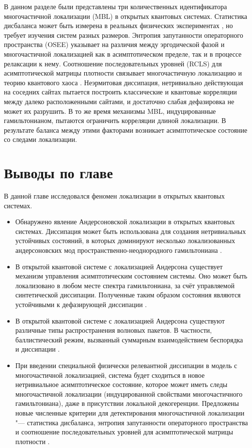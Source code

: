 В данном разделе были представлены три количественных идентификатора многочастичной локализации (MBL) в открытых квантовых системах.
Статистика дисбаланса может быть измерена в реальных физических экспериментах \cite{Schreiber2015, Choi2016, Bordia2017, Lschen2017}, но требует изучения систем разных размеров. 
Энтропия запутанности операторного пространства (OSEE) указывает на различия между эргодической фазой и многочастичной локализацией как в асимптотическом пределе, так и в процессе релаксации к нему.
Соотношение последовательных уровней (RCLS) для асимптотической матрицы плотности связывает многочастичную локализацию и теорию квантового хаоса \cite{Prosen2013, Haake2018}. 
Неэрмитовая диссипация, нетривиально действующая на соседних сайтах пытается построить классические и квантовые корреляции между далеко расположенными сайтами, и достаточно слабая дефазировка не может их разрушить. 
В то же время механизмы MBL, индуцированные гамильтонианом, пытаются ограничить корреляции длиной локализации. 
В результате баланса между этими факторами возникает асимптотическое состояние со следами локализации.

\section{Выводы по главе}\label{sec:ch2/results}
В данной главе исследовался феномен локализации в открытых квантовых системах.
\begin{itemize}[beginpenalty=10000] %
	\item Обнаружено явление Андерсоновской локализации в открытых квантовых системах. Диссипация может быть использована для создания нетривиальных устойчивых состояний, в которых доминируют несколько локализованных андерсоновских мод пространственно-неоднородного гамильтониана \cite{Yusipov2017}.
	\item В открытой квантовой системе с локализацией Андерсона существует механизм управления асимптотическим состоянием системы. Оно может быть локализовано в любом месте спектра гамильтониана, за счёт управляемой синтетической диссипации. Полученные таким образом состояния являются устойчивыми к дефазирующей диссипации \cite{Vershinina2017}.
	\item В открытой квантовой системе с локализацией Андерсона существуют различные типы распространения волновых пакетов. В частности, баллистический режим, вызванный суммарным взаимодействием беспорядка и диссипации \cite{Yusipov2018}. 
	\item При введении специальной физически релевантной диссипации в модель с многочастичной локализацией, система будет сходиться в новое нетривиальное асимптотическое состояние, которое может иметь следы многочастичной локализации (индуцированной свойствами многочастичного гамильтониана), даже в присутствии локальной декогеренции. Предложены новые численные критерии для детектирования многочастичной локализации "--- статистика дисбаланса, энтропия запутанности операторного пространства и соотношение последовательных уровней для асимптотической матрицы плотности \cite{Vakulchyk2018}.
\end{itemize}


